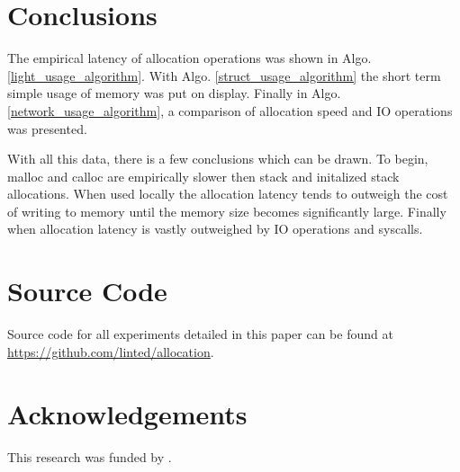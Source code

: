 \documentclass[letterpaper, 10 pt, conference]{ieeeconf}  %
\newcommand*\GitHubLoc{https://github.com/linted/allocation}
\begin{document}


\section{Conclusions}
The empirical latency of allocation operations was shown in Algo. \ref{light_usage_algorithm}.
With Algo. \ref{struct_usage_algorithm} the short term simple usage of memory was put on display.
Finally in Algo. \ref{network_usage_algorithm}, a comparison of allocation speed and IO operations was presented.

With all this data, there is a few conclusions which can be drawn.
To begin, malloc and calloc are empirically slower then stack and initalized stack allocations.
When used locally the allocation latency tends to outweigh the cost of writing to memory until the memory size becomes significantly large.
Finally when allocation latency is vastly outweighed by IO operations and syscalls.

\section{Source Code}

Source code for all experiments detailed in this paper can be found at \url{\GitHubLoc}.



\section{Acknowledgements}

\noindent This research was funded by .

\clearpage
\end{document}
